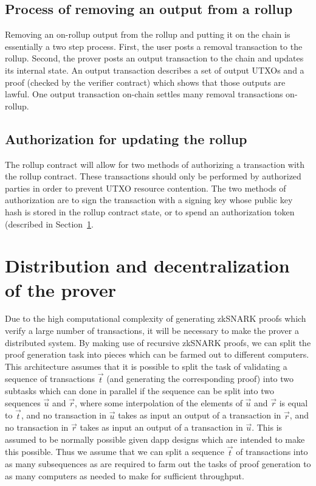 \documentclass[12pt]{article}
\begin{document}
\subsection{Process of removing an output from a rollup}

Removing an on-rollup output from the rollup and putting it on the chain is essentially a two step process. First, the user posts a removal transaction to the rollup. Second, the prover posts an output transaction to the chain and updates its internal state. An output transaction describes a set of output UTXOs and a proof (checked by the verifier contract) which shows that those outputs are lawful. One output transaction on-chain settles many removal transactions on-rollup.

\subsection{Authorization for updating the rollup}

The rollup contract will allow for two methods of authorizing a transaction with the rollup contract. These transactions should only be performed by authorized parties in order to prevent UTXO resource contention. The two methods of authorization are to sign the transaction with a signing key whose public key hash is stored in the rollup contract state, or to spend an authorization token (described in Section~\ref{sec:distribution-decentralization}.


\section{Distribution and decentralization of the prover}
\label{sec:distribution-decentralization}

Due to the high computational complexity of generating zkSNARK proofs which verify a large number of transactions, it will be necessary to make the prover a distributed system. By making use of recursive zkSNARK proofs, we can split the proof generation task into pieces which can be farmed out to different computers. This architecture assumes that it is possible to split the task of validating a sequence of transactions $\vec{t}$ (and generating the corresponding proof) into two subtasks which can done in parallel if the sequence can be split into two sequences $\vec{u}$ and $\vec{r}$, where some interpolation of the elements of $\vec{u}$ and $\vec{r}$ is equal to $\vec{t}$, and no transaction in $\vec{u}$ takes as input an output of a transaction in $\vec{r}$, and no transaction in $\vec{r}$ takes as input an output of a transaction in $\vec{u}$. This is assumed to be normally possible given dapp designs which are intended to make this possible. Thus we assume that we can split a sequence $\vec{t}$ of transactions into as many subsequences as are required to farm out the tasks of proof generation to as many computers as needed to make for sufficient throughput.
\end{document}
